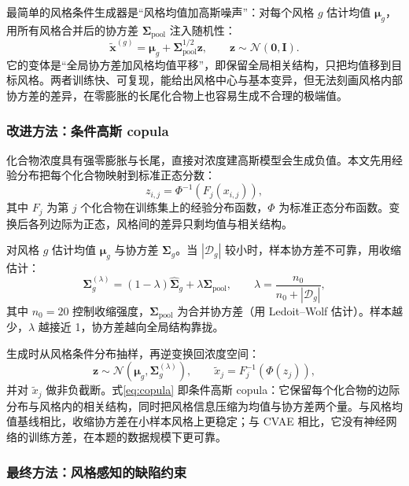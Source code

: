 ﻿\documentclass[UTF8,a4paper,zihao=-4]{ctexart}
\numberwithin{figure}{section}
\numberwithin{table}{section}
\numberwithin{equation}{section}
\newcommand{\bI}{\bm{I}}
\newcommand{\bSigma}{\bm{\Sigma}}
\begin{document}
最简单的风格条件生成器是“风格均值加高斯噪声”：对每个风格 $g$ 估计均值 $\bm{\mu}_g$，用所有风格合并后的协方差 $\bSigma_{\mathrm{pool}}$ 注入随机性：
\begin{equation}
\tilde{\bm{x}}^{(g)}=\bm{\mu}_g+\bSigma_{\mathrm{pool}}^{1/2}\bm{z},\qquad \bm{z}\sim\mathcal{N}(\bm{0},\bI).
\label{eq:mean-noise}
\end{equation}
它的变体是“全局协方差加风格均值平移”，即保留全局相关结构，只把均值移到目标风格。两者训练快、可复现，能给出风格中心与基本变异，但无法刻画风格内部协方差的差异，在零膨胀的长尾化合物上也容易生成不合理的极端值。

\subsubsection{改进方法：条件高斯 copula}

化合物浓度具有强零膨胀与长尾，直接对浓度建高斯模型会生成负值。本文先用经验分布把每个化合物映射到标准正态分数：
\begin{equation}
z_{i,j}=\Phi^{-1}\left(F_j(x_{i,j})\right),
\label{eq:normal-score}
\end{equation}
其中 $F_j$ 为第 $j$ 个化合物在训练集上的经验分布函数，$\Phi$ 为标准正态分布函数。变换后各列边际为正态，风格间的差异只剩均值与相关结构。

对风格 $g$ 估计均值 $\bm{\mu}_g$ 与协方差 $\bSigma_g$。当 $|\mathcal{D}_g|$ 较小时，样本协方差不可靠，用收缩估计：
\begin{equation}
\bSigma_g^{(\lambda)}=(1-\lambda)\hat{\bSigma}_g+\lambda\bSigma_{\mathrm{pool}},\qquad
\lambda=\frac{n_0}{n_0+|\mathcal{D}_g|},
\label{eq:shrinkage}
\end{equation}
其中 $n_0=20$ 控制收缩强度，$\bSigma_{\mathrm{pool}}$ 为合并协方差（用 Ledoit--Wolf 估计）。样本越少，$\lambda$ 越接近 1，协方差越向全局结构靠拢。

生成时从风格条件分布抽样，再逆变换回浓度空间：
\begin{equation}
\bm{z}\sim\mathcal{N}\left(\bm{\mu}_g,\bSigma_g^{(\lambda)}\right),\qquad
\tilde{x}_j=F_j^{-1}\left(\Phi(z_j)\right),
\label{eq:copula}
\end{equation}
并对 $\tilde{x}_j$ 做非负截断。式\eqref{eq:copula} 即条件高斯 copula：它保留每个化合物的边际分布与风格内的相关结构，同时把风格信息压缩为均值与协方差两个量。与风格均值基线相比，收缩协方差在小样本风格上更稳定；与 CVAE 相比，它没有神经网络的训练方差，在本题的数据规模下更可靠。

\subsubsection{最终方法：风格感知的缺陷约束}
\end{document}
